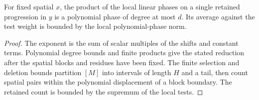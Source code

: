 \begin{lemma}\label{checked-local-phase}
\leanok
For fixed spatial $x$, the product of the local linear phases
on a single retained progression in $y$ is a polynomial phase
of degree at most $d$. Its average against the test weight is
bounded by the local polynomial-phase norm.
\end{lemma}
\begin{proof}
\leanok
The exponent is the sum of scalar multiples of the shifts and
constant terms. Polynomial degree bounds and finite products
give the stated reduction after the spatial blocks and residues
have been fixed. The finite selection and deletion bounds partition
$[M]$ into intervals of length $H$ and a tail, then count spatial
pairs within the polynomial displacement of a block boundary.
The retained count is bounded by the supremum of the local tests.
\end{proof}

